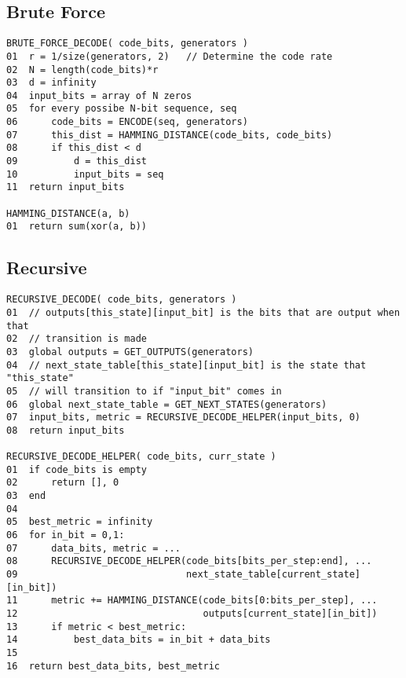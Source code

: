 \documentclass[11pt]{article}
\begin{document}
        \subsection{Brute Force}
        \begin{verbatim}
BRUTE_FORCE_DECODE( code_bits, generators )
01  r = 1/size(generators, 2)   // Determine the code rate
02  N = length(code_bits)*r
03  d = infinity
04  input_bits = array of N zeros
05  for every possibe N-bit sequence, seq 
06      code_bits = ENCODE(seq, generators)
07      this_dist = HAMMING_DISTANCE(code_bits, code_bits)
08      if this_dist < d
09          d = this_dist
10          input_bits = seq
11  return input_bits

HAMMING_DISTANCE(a, b)
01  return sum(xor(a, b))
        \end{verbatim}

        \subsection{Recursive}
        \begin{verbatim}
RECURSIVE_DECODE( code_bits, generators )
01  // outputs[this_state][input_bit] is the bits that are output when that
02  // transition is made
03  global outputs = GET_OUTPUTS(generators)
04  // next_state_table[this_state][input_bit] is the state that "this_state"
05  // will transition to if "input_bit" comes in
06  global next_state_table = GET_NEXT_STATES(generators)
07  input_bits, metric = RECURSIVE_DECODE_HELPER(input_bits, 0)
08  return input_bits

RECURSIVE_DECODE_HELPER( code_bits, curr_state )
01  if code_bits is empty
02      return [], 0
03  end
04   
05  best_metric = infinity
06  for in_bit = 0,1:
07      data_bits, metric = ...
08      RECURSIVE_DECODE_HELPER(code_bits[bits_per_step:end], ...
09                              next_state_table[current_state][in_bit])
11      metric += HAMMING_DISTANCE(code_bits[0:bits_per_step], ...
12                                 outputs[current_state][in_bit])
13      if metric < best_metric:
14          best_data_bits = in_bit + data_bits
15
16  return best_data_bits, best_metric
        \end{verbatim}
\end{document}
